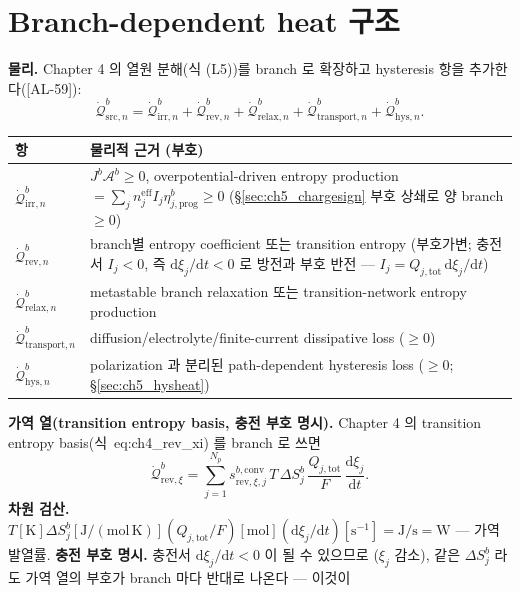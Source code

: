 \documentclass[11pt,a4paper]{article}
\newcommand{\dd}{\mathrm{d}}
\newcommand{\eff}{\mathrm{eff}}
\newcommand{\tot}{\mathrm{tot}}
\newcommand{\irr}{\mathrm{irr}}
\newcommand{\rev}{\mathrm{rev}}
\newcommand{\src}{\mathrm{src}}
\newcommand{\rlx}{\mathrm{relax}}
\newcommand{\prog}{\mathrm{prog}}
\newcommand{\conv}{\mathrm{conv}}
\newcommand{\transp}{\mathrm{transport}}
\newcommand{\hys}{\mathrm{hys}}
\newcommand{\AL}[1]{\textsf{[AL-#1]}}
\begin{document}
\section{Branch-dependent heat 구조}\label{sec:ch5_branchheat}
\textbf{물리.} Chapter 4 의 열원 분해(식 (L5))를 branch 로 확장하고 hysteresis 항을 추가한다(\AL{59}):
\begin{equation}
\dot{\mathcal Q}_{\src,n}^b=\dot{\mathcal Q}_{\irr,n}^b+\dot{\mathcal Q}_{\rev,n}^b+\dot{\mathcal Q}_{\rlx,n}^b
+\dot{\mathcal Q}_{\transp,n}^b+\dot{\mathcal Q}_{\hys,n}^b.
\label{eq:ch5_branch_heat}
\end{equation}
\begin{longtable}{p{} >{\raggedright\arraybackslash}p{}}
\toprule 항 & 물리적 근거 (부호) \\ \midrule \endhead
$\dot{\mathcal Q}_{\irr,n}^b$ & $J^b\mathcal A^b\ge0$, overpotential-driven entropy production $=\sum_j n_j^{\eff}I_j\eta_{j,\prog}^b\ge0$ (\S\ref{sec:ch5_chargesign} 부호 상쇄로 양 branch $\ge0$) \\
$\dot{\mathcal Q}_{\rev,n}^b$ & branch별 entropy coefficient 또는 transition entropy (부호가변; 충전서 $I_j<0$, 즉 $\dd\xi_j/\dd t<0$ 로 방전과 부호 반전 — $I_j=Q_{j,\tot}\,\dd\xi_j/\dd t$) \\
$\dot{\mathcal Q}_{\rlx,n}^b$ & metastable branch relaxation 또는 transition-network entropy production \\
$\dot{\mathcal Q}_{\transp,n}^b$ & diffusion/electrolyte/finite-current dissipative loss ($\ge0$) \\
$\dot{\mathcal Q}_{\hys,n}^b$ & polarization 과 분리된 path-dependent hysteresis loss ($\ge0$; \S\ref{sec:ch5_hysheat}) \\
\bottomrule
\end{longtable}
\textbf{가역 열(transition entropy basis, 충전 부호 명시).} Chapter 4 의 transition entropy basis(식~eq:ch4\_rev\_xi)
를 branch 로 쓰면
\begin{equation}
\dot{\mathcal Q}_{\rev,\xi}^b=\sum_{j=1}^{N_p}s_{\rev,\xi,j}^{b,\conv}\,T\,\Delta S_j^b\,\frac{Q_{j,\tot}}{F}\,\frac{\dd\xi_j}{\dd t}.
\label{eq:ch5_branch_rev}
\end{equation}
\textbf{차원 검산.} $T[\mathrm K]\Delta S_j^b[\mathrm{J/(mol\,K)}](Q_{j,\tot}/F)[\mathrm{mol}](\dd\xi_j/\dd t)[\mathrm{s^{-1}}]
=\mathrm{J/s}=\mathrm W$ — 가역 발열률. \textbf{충전 부호 명시.} 충전서 $\dd\xi_j/\dd t<0$ 이 될 수 있으므로
($\xi_j$ 감소), 같은 $\Delta S_j^b$ 라도 가역 열의 부호가 branch 마다 반대로 나온다 — 이것이
\end{document}
